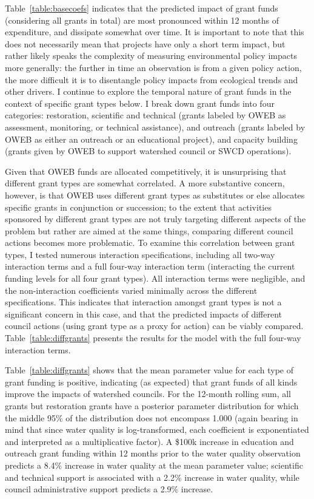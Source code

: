 \documentclass[12pt,a4paper,titlepage]{article}
\begin{document}
Table~\ref{table:basecoefs} indicates that the predicted impact of grant funds (considering all grants in total) are most pronounced within 12 months of expenditure, and dissipate somewhat over time. It is important to note that this does not necessarily mean that projects have only a short term impact, but rather likely speaks the complexity of measuring environmental policy impacts more generally: the further in time an observation is from a given policy action, the more difficult it is to disentangle policy impacts from ecological trends and other drivers. I continue to explore the temporal nature of grant funds in the context of specific grant types below. I break down grant funds into four categories: restoration, scientific and technical (grants labeled by OWEB as assessment, monitoring, or technical assistance), and outreach (grants labeled by OWEB as either an outreach or an educational project), and capacity building (grants given by OWEB to support watershed council or SWCD operations).

Given that OWEB funds are allocated competitively, it is unsurprising that different grant types are somewhat correlated. A more substantive concern, however, is that OWEB uses different grant types as substitutes or else allocates specific grants in conjunction or succession; to the extent that activities sponsored by different grant types are not truly targeting different aspects of the problem but rather are aimed at the same things, comparing different council actions becomes more problematic. To examine this correlation between grant types, I tested numerous interaction specifications, including all two-way interaction terms and a full four-way interaction term (interacting the current funding levels for all four grant types). All interaction terms were negligible, and the non-interaction coefficients varied minimally across the different specifications. This indicates that interaction amongst grant types is not a significant concern in this case, and that the predicted impacts of different council actions (using grant type as a proxy for action) can be viably compared. Table~\ref{table:diffgrants} presents the results for the model with the full four-way interaction terms.


Table~\ref{table:diffgrants} shows that the mean parameter value for each type of grant funding is positive, indicating (as expected) that grant funds of all kinds improve the impacts of watershed councils. For the 12-month rolling sum, all grants but restoration grants have a posterior parameter distribution for which the middle 95\% of the distribution does not encompass 1.000 (again bearing in mind that since water quality is log-transformed, each coefficient is exponentiated and interpreted as a multiplicative factor). A \$100k increase in education and outreach grant funding within 12 months prior to the water quality observation predicts a 8.4\% increase in water quality at the mean parameter value; scientific and technical support is associated with a 2.2\% increase in water quality, while council administrative support predicts a 2.9\% increase.
\end{document}
